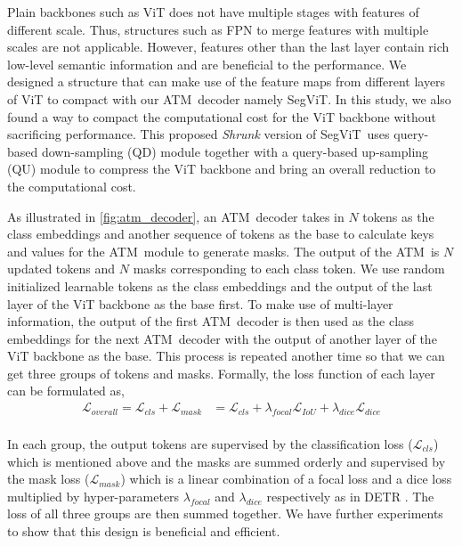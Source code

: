 \documentclass{article}
\makeatletter
\renewcommand{\paragraph}{\@startsection{paragraph}{4}{\z@}{.5ex \@plus 1ex \@minus .2ex}{-1em}{\normalfont\normalsize\bfseries}}
\def\atm{ATM}
\def\seg{SegViT}
\makeatother
\begin{document}
Plain backbones such as ViT does not have multiple stages with features of different scale. Thus, structures such as FPN to merge features with multiple scales are not applicable. 
However, features other than the last layer contain rich low-level semantic information and are beneficial to the performance. 
We designed a structure that can make use of the feature maps from different layers of ViT to compact with our \atm\ decoder namely \seg.
In this study, we also found a way to compact the computational cost for the ViT backbone without sacrificing performance.
This proposed \emph{Shrunk} version of \seg\ uses query-based down-sampling (QD) module together with a query-based up-sampling (QU) module to compress the ViT backbone and bring an overall reduction to the computational cost. 

\paragraph{The \seg\ structure.}
As illustrated in \cref{fig:atm_decoder},
an \atm\ decoder takes in $N$ tokens as the class embeddings and another sequence of tokens as the base to calculate keys and values for the \atm\ module to generate masks. 
The output of the \atm\  is $N$ updated tokens and $N$ masks corresponding to each class token. 
We use random initialized learnable tokens as the class embeddings and the output of the last layer of the ViT backbone as the base first.
To make use of multi-layer information, the output of the first \atm\ decoder is then used as the class embeddings for
the next \atm\ decoder with the output of another layer of the ViT backbone as the base.
This process is repeated another time so that we can get three groups of tokens and masks. 
Formally, the loss function of each layer  can be formulated as,
\begin{equation}
    \begin{aligned}
    \mathcal{L}_{overall}=\mathcal{L}_{cls} +\mathcal{L}_{mask} & =\mathcal{L}_{cls} +
    \lambda_{focal}\mathcal{L}_{IoU} + \lambda_{dice}\mathcal{L}_{dice} \\
    \end{aligned}
\end{equation}

In each group, the output tokens are supervised by the classification loss ($\mathcal{L}_{cls}$) which is mentioned above and the masks are summed orderly and supervised by the mask loss ($\mathcal{L}_{mask}$) which is a linear combination of a focal loss \cite{lin2017focal} and a dice loss \cite{diceloss} multiplied by hyper-parameters $\lambda_{focal}$ and $\lambda_{dice}$ respectively as in DETR \cite{detr}. The loss of all three groups are then summed together.
We have further experiments to show that this design is beneficial and efficient.
\end{document}
